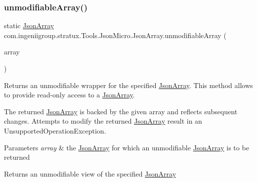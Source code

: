 \subsubsection{\texorpdfstring{unmodifiable\+Array()}{unmodifiableArray()}}
{\footnotesize\ttfamily static \hyperlink{classcom_1_1ingeniigroup_1_1stratux_1_1_tools_1_1_json_micro_1_1_json_array}{Json\+Array} com.\+ingeniigroup.\+stratux.\+Tools.\+Json\+Micro.\+Json\+Array.\+unmodifiable\+Array (\begin{DoxyParamCaption}\item[{\hyperlink{classcom_1_1ingeniigroup_1_1stratux_1_1_tools_1_1_json_micro_1_1_json_array}{Json\+Array}}]{array }\end{DoxyParamCaption})\hspace{0.3cm}{\ttfamily [static]}}

Returns an unmodifiable wrapper for the specified \hyperlink{classcom_1_1ingeniigroup_1_1stratux_1_1_tools_1_1_json_micro_1_1_json_array}{Json\+Array}. This method allows to provide read-\/only access to a \hyperlink{classcom_1_1ingeniigroup_1_1stratux_1_1_tools_1_1_json_micro_1_1_json_array}{Json\+Array}. 

The returned \hyperlink{classcom_1_1ingeniigroup_1_1stratux_1_1_tools_1_1_json_micro_1_1_json_array}{Json\+Array} is backed by the given array and reflects subsequent changes. Attempts to modify the returned \hyperlink{classcom_1_1ingeniigroup_1_1stratux_1_1_tools_1_1_json_micro_1_1_json_array}{Json\+Array} result in an {\ttfamily Unsupported\+Operation\+Exception}. 


\begin{DoxyParams}{Parameters}
{\em array} & the \hyperlink{classcom_1_1ingeniigroup_1_1stratux_1_1_tools_1_1_json_micro_1_1_json_array}{Json\+Array} for which an unmodifiable \hyperlink{classcom_1_1ingeniigroup_1_1stratux_1_1_tools_1_1_json_micro_1_1_json_array}{Json\+Array} is to be returned \\
\hline
\end{DoxyParams}
\begin{DoxyReturn}{Returns}
an unmodifiable view of the specified \hyperlink{classcom_1_1ingeniigroup_1_1stratux_1_1_tools_1_1_json_micro_1_1_json_array}{Json\+Array} 
\end{DoxyReturn}
\mbox{\label{classcom_1_1ingeniigroup_1_1stratux_1_1_tools_1_1_json_micro_1_1_json_array_a266a0d9090082147fc38fc75bbaba0e1}} 

